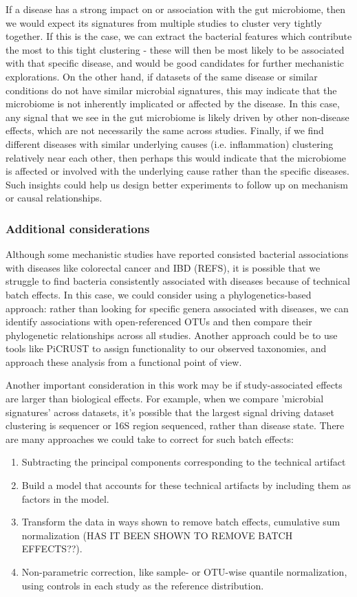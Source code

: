 \documentclass[12pt]{article}
\begin{document}
If a disease has a strong impact on or association with the gut microbiome, then we would expect its signatures from multiple studies to cluster very tightly together. If this is the case, we can extract the bacterial features which contribute the most to this tight clustering - these will then be most likely to be associated with that specific disease, and would be good candidates for further mechanistic explorations. On the other hand, if datasets of the same disease or similar conditions do not have similar microbial signatures, this may indicate that the microbiome is not inherently implicated or affected by the disease. In this case, any signal that we see in the gut microbiome is likely driven by other non-disease effects, which are not necessarily the same across studies. Finally, if we find different diseases with similar underlying causes (i.e. inflammation) clustering relatively near each other, then perhaps this would indicate that the microbiome is affected or involved with the underlying cause rather than the specific diseases. Such insights could help us design better experiments to follow up on mechanism or causal relationships.

\subsubsection{Additional considerations}
Although some mechanistic studies have reported consisted bacterial associations with diseases like colorectal cancer and IBD (REFS), it is possible that we struggle to find bacteria consistently associated with diseases because of technical batch effects. In this case, we could consider using a phylogenetics-based approach: rather than looking for specific genera associated with diseases, we can identify associations with open-referenced OTUs and then compare their phylogenetic relationships across all studies. Another approach could be to use tools like PiCRUST to assign functionality to our observed taxonomies, and approach these analysis from a functional point of view.


Another important consideration in this work may be if study-associated effects are larger than biological effects. For example, when we compare 'microbial signatures' across datasets, it's possible that the largest signal driving dataset clustering is sequencer or 16S region sequenced, rather than disease state. There are many approaches we could take to correct for such batch effects:
\begin{enumerate}
	\item Subtracting the principal components corresponding to the technical artifact
	\item Build a model that accounts for these technical artifacts by including them as factors in the model.
	\item Transform the data in ways shown to remove batch effects, cumulative sum normalization (HAS IT BEEN SHOWN TO REMOVE BATCH EFFECTS??).
	\item Non-parametric correction, like sample- or OTU-wise quantile normalization, using controls in each study as the reference distribution.
\end{enumerate}
\end{document}
